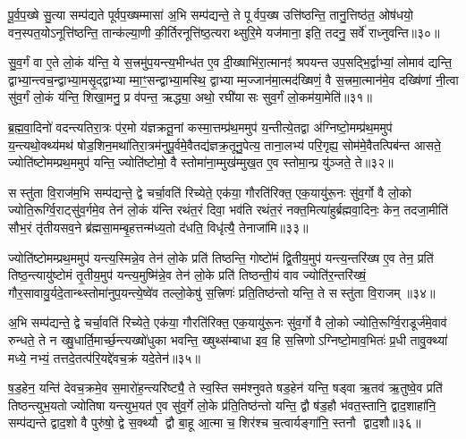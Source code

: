 पू॒र्व॒प॒ख्षे सु॒त्या सम्प॑द्यते पूर्वप॒ख्षम्मासा॑ अ॒भि सम्प॑द्यन्ते॒ ते पूर्वप॒ख्ष उत्ति॑ष्ठन्ति॒ तानु॒त्तिष्ठ॑त॒ ओष॑धयो॒ वन॒स्पत॒योऽनूत्ति॑ष्ठन्ति॒ तान्क॑ल्या॒णी की॒र्तिरनूत्ति॑ष्ठ॒त्यराथ्सुरि॒मे यज॑माना॒ इति॒ तदनु॒ सर्वे॑ राध्नुवन्ति॥३०॥

{\anuvakamend[{ए॒तच्छ॒म्बट्कु॑र्वन्ति॒ तेषा॒ञ्चतु॑स्त्रिशच्च॥८॥}]}

सु॒व॒र्गं वा ए॒ते लो॒कं य॑न्ति॒ ये स॒त्त्रमु॑प॒यन्त्य॒भीन्ध॑त ए॒व दी॒ख्षाभि॑रा॒त्मानꣵ॑ श्रपयन्त उप॒सद्भि॒र्द्वाभ्यां॒ लोमाव॑ द्यन्ति॒ द्वाभ्या॒न्त्वच॒न्द्वाभ्या॒मसृ॒द्द्वाभ्याम्मा॒ꣳ॒सन्द्वाभ्या॒मस्थि॒ द्वाभ्याम्म॒ज्जान॑मा॒त्मद॑ख्षिणं॒ वै स॒त्त्रमा॒त्मान॑मे॒व दख्षि॑णां नी॒त्वा सु॑व॒र्गं लो॒कं य॑न्ति॒ शिखा॒मनु॒ प्र व॑पन्त॒ ऋद्ध्या॒ अथो॒ रघी॑यासः सुव॒र्गं लो॒कम॑या॒मेति॑॥३१॥

{\anuvakamend[{सु॒व॒र्गम्प॑ञ्चा॒शत्॥९॥}]}

ब्र॒ह्म॒वा॒दिनो॑ वदन्त्यतिरा॒त्रः प॑र॒मो य॑ज्ञक्रतू॒नां कस्मा॒त्तम्प्र॑थ॒ममुप॑ य॒न्तीत्ये॒तद्वा अ॑ग्निष्टो॒मम्प्र॑थ॒ममुप॑ य॒न्त्यथो॒क्थ्य॑मथ॑ षोड॒शिन॒मथा॑तिरा॒त्रम॑नुपू॒र्वमे॒वैतद्य॑ज्ञक्र॒तूनु॒पेत्य॒ ताना॒लभ्य॑ परि॒गृह्य॒ सोम॑मे॒वैतत्पिब॑न्त आसते॒ ज्योति॑ष्टोमम्प्रथ॒ममुप॑ यन्ति॒ ज्योति॑ष्टोमो॒ वै स्तोमा॑ना॒म्मुख॑म्मुख॒त ए॒व स्तोमा॒न्प्र यु॑ञ्जते॒ ते॥३२॥

सस्तु॑ता वि॒राज॑म॒भि सम्प॑द्यन्ते॒ द्वे चर्चा॒वति॑ रिच्येते॒ एक॑या॒ गौरति॑रिक्त॒ एक॒यायु॑रू॒नः सु॑व॒र्गो वै लो॒को ज्योति॒रूर्ग्वि॒राट्सु॑व॒र्गमे॒व तेन॑ लो॒कं य॑न्ति रथंत॒रं दिवा॒ भव॑ति रथंत॒रं नक्त॒मित्या॑हुर्ब्रह्मवा॒दिनः॒ केन॒ तदजा॒मीति॑ सौभ॒रं तृ॑तीयसव॒ने ब्र॑ह्मसा॒मम्बृ॒हत्तन्म॑ध्य॒तो द॑धति॒ विधृ॑त्यै॒ तेनाजा॑मि॥३३॥

{\anuvakamend[{त एका॒न्नप॑ञ्चा॒शच्च॑॥10॥}]}

ज्योति॑ष्टोमम्प्रथ॒ममुप॑ यन्त्य॒स्मिन्ने॒व तेन॑ लो॒के प्रति॑ तिष्ठन्ति॒ गोष्टो॑मं द्वि॒तीय॒मुप॑ यन्त्य॒न्तरि॑ख्ष ए॒व तेन॒ प्रति॑ तिष्ठ॒न्त्यायु॑ष्टोमं तृ॒तीय॒मुप॑ यन्त्य॒मुष्मि॑न्ने॒व तेन॑ लो॒के प्रति॑ तिष्ठन्ती॒यं वाव ज्योति॑र॒न्तरि॑ख्षं॒ गौर॒सावायु॒र्यदे॒तान्थ्स्तोमा॑नुप॒यन्त्ये॒ष्वे॑व तल्लो॒केषु॑ स॒त्त्रिणः॑ प्रति॒तिष्ठ॑न्तो यन्ति॒ ते सस्तु॑ता वि॒राजम्॥३४॥

अ॒भि सम्प॑द्यन्ते॒ द्वे चर्चा॒वति॑ रिच्येते॒ एक॑या॒ गौरति॑रिक्त॒ एक॒यायु॑रू॒नः सु॑व॒र्गो वै लो॒को ज्योति॒रूर्ग्वि॒राडूर्ज॑मे॒वाव॑ रुन्धते॒ ते न ख्षु॒धार्ति॒मार्च्छ॒न्त्यख्षो॑धुका भवन्ति॒ ख्षुथ्स॑म्बाधा इव॒ हि स॒त्त्रिणोऽग्निष्टो॒माव॒भितः॑ प्र॒धी तावु॒क्थ्या॑ मध्ये॒ नभ्यं॒ तत्तदे॒तत्प॑रि॒यद्दे॑वच॒क्रं यदे॒तेन॑॥३५॥

ष॒ड॒हेन॒ यन्ति॑ देवच॒क्रमे॒व स॒मारो॑ह॒न्त्यरि॑ष्ट्यै॒ ते स्व॒स्ति सम॑श्नुवते षड॒हेन॑ यन्ति॒ षड्वा ऋ॒तव॑ ऋ॒तुष्वे॒व प्रति॑ तिष्ठन्त्युभ॒यतोज्योतिषा यन्त्युभ॒यत॑ ए॒व सु॑व॒र्गे लो॒के प्र॑ति॒तिष्ठ॑न्तो यन्ति॒ द्वौ ष॑ड॒हौ भ॑वत॒स्तानि॒ द्वाद॒शाहा॑नि॒ सम्प॑द्यन्ते द्वाद॒शो वै पुरु॑षो॒ द्वे स॒क्थ्यौ द्वौ बा॒हू आ॒त्मा च॒ शिर॑श्च च॒त्वार्यङ्गा॑नि॒ स्तनौ द्वाद॒शौ॥३६॥

